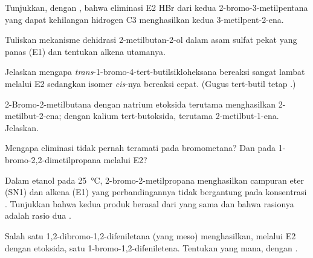 \begin{exercise}[$\star\star$]\label{exo:b1:elimination:5}
Tunjukkan, dengan , bahwa eliminasi E2 HBr dari kedua
 2-bromo-3-metilpentana yang dapat kehilangan hidrogen C3
menghasilkan kedua  3-metilpent-2-ena.
\end{exercise}

\begin{exercise}[$\star\star$]\label{exo:b1:elimination:6}
Tuliskan mekanisme dehidrasi 2-metilbutan-2-ol dalam asam sulfat pekat
yang panas (E1) dan tentukan alkena utamanya.
\end{exercise}

\begin{exercise}[$\star\star$]\label{exo:b1:elimination:7}
Jelaskan mengapa \textit{trans}-1-bromo-4-tert-butilsikloheksana bereaksi
sangat lambat melalui E2 sedangkan isomer \textit{cis}-nya bereaksi cepat.
(Gugus tert-butil tetap .)
\end{exercise}

\begin{exercise}[$\star\star$]\label{exo:b1:elimination:8}
2-Bromo-2-metilbutana dengan natrium etoksida terutama menghasilkan
2-metilbut-2-ena; dengan kalium tert-butoksida, terutama
2-metilbut-1-ena. Jelaskan.
\end{exercise}

\begin{exercise}[$\star\star$]\label{exo:b1:elimination:9}
Mengapa eliminasi tidak pernah teramati pada bromometana? Dan pada
1-bromo-2,2-dimetilpropana melalui E2?
\end{exercise}

\begin{exercise}[$\star\star\star$]\label{exo:b1:elimination:10}
Dalam etanol pada \qty{25}{\celsius}, 2-bromo-2-metilpropana menghasilkan
campuran eter (SN1) dan alkena (E1) yang perbandingannya tidak
bergantung pada konsentrasi . Tunjukkan bahwa kedua produk berasal
dari  yang sama dan bahwa rasionya adalah rasio dua .
\end{exercise}

\begin{exercise}[$\star\star\star$]\label{exo:b1:elimination:11}
Salah satu  1,2-dibromo-1,2-difeniletana (yang meso)
menghasilkan, melalui E2 dengan etoksida, satu 
1-bromo-1,2-difeniletena. Tentukan yang mana, dengan .
\end{exercise}

